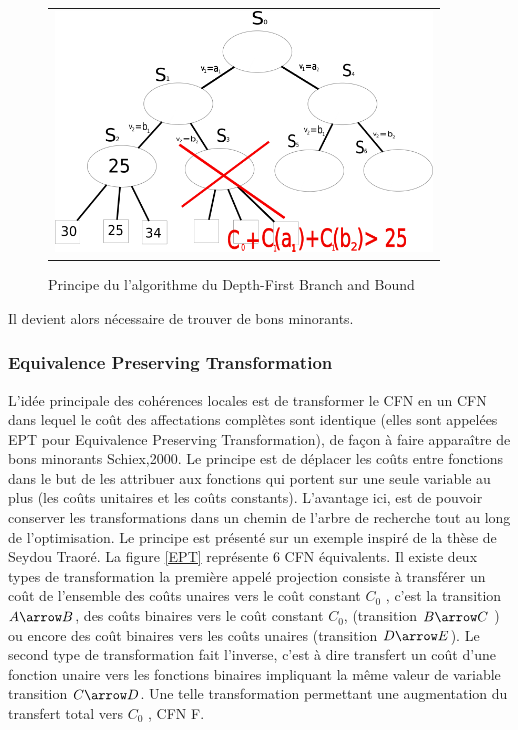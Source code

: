 \begin{figure}[!htbp]
  \centering
  \begin{tabular}{c}
    \includegraphics[width=10cm]{figure/DFBB.png} \\
  \end{tabular}
  \caption{Principe du l'algorithme du Depth-First Branch and Bound}
  \label{fig:DFBB}
\end{figure}



Il devient alors nécessaire de trouver de bons minorants.

\subsubsection{Equivalence Preserving Transformation}

L'idée principale des cohérences locales est de transformer le CFN en un CFN dans lequel le coût des affectations complètes sont identique (elles sont appelées EPT pour \og Equivalence Preserving Transformation\fg), de façon à faire apparaître de bons minorants Schiex,2000. Le principe est de déplacer les coûts entre fonctions dans le but de les attribuer aux fonctions qui portent sur une seule variable au plus (les coûts unitaires et les coûts constants). L'avantage ici, est de pouvoir conserver les transformations dans un chemin de l'arbre de recherche tout au long de l'optimisation. Le principe est présenté sur un exemple inspiré de la thèse de Seydou Traoré. La figure \ref{EPT} représente 6 CFN équivalents. Il existe deux types de transformation la première appelé projection consiste à transférer un coût de l'ensemble des coûts unaires vers le coût constant $C_0$ , c'est la transition $A\arrow B$, des coûts binaires vers le coût constant $C_0$, (transition $B\arrow C$ ) ou encore des coût binaires vers les coûts unaires (transition $D\arrow E$). Le second type de transformation fait l'inverse, c'est à dire transfert un coût d'une fonction unaire vers les fonctions binaires impliquant la même valeur de variable transition $C \arrow D$. Une telle transformation permettant une augmentation du transfert total vers $C_0$ , CFN F.



